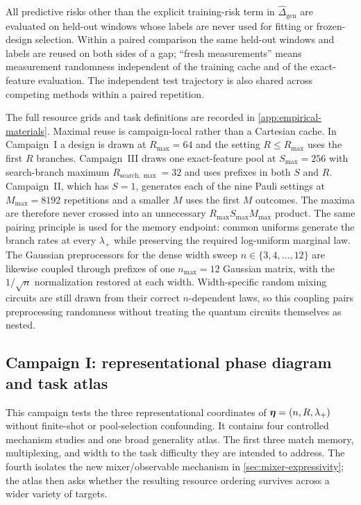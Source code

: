 All predictive risks other than the explicit training-risk term in
$\widehat\Delta_{\mathrm{gen}}$ are evaluated on held-out windows whose labels
are never used for fitting or frozen-design selection.  Within a paired
comparison the same held-out windows and labels are reused on both sides of a
gap; ``fresh measurements'' means measurement randomness independent of the
training cache and of the exact-feature evaluation.  The independent test
trajectory is also shared across competing methods within a paired repetition.

The full resource grids and task definitions are recorded in
\cref{app:empirical-materials}.  Maximal reuse is campaign-local rather than a
Cartesian cache.  In Campaign~I a design is drawn at $R_{\max}=64$ and the
setting $R\leq R_{\max}$ uses the first $R$ branches.  Campaign~III draws one
exact-feature pool at $S_{\max}=256$ with search-branch maximum
$R_{\mathrm{search},\max}=32$ and uses prefixes in both $S$ and $R$.
Campaign~II, which has $S=1$, generates each of the nine Pauli settings at
$M_{\max}=8192$ repetitions and a smaller $M$ uses the first $M$ outcomes.
The maxima are therefore never crossed into an unnecessary
$R_{\max}S_{\max}M_{\max}$ product.  The same pairing principle is used for
the memory endpoint: common uniforms generate the branch rates at every
$\lambda_+$ while preserving the required log-uniform marginal law.  The
Gaussian preprocessors for the dense width sweep $n\in\{3,4,\ldots,12\}$ are likewise
coupled through prefixes of one $n_{\max}=12$ Gaussian matrix, with the
$1/\sqrt n$ normalization restored at each width.  Width-specific random mixing circuits are still drawn from their correct $n$-dependent laws, so this coupling pairs preprocessing randomness without treating the quantum circuits themselves as nested.

\subsection{Campaign I: representational phase diagram and task atlas}
\label{sec:empirical-representation}

This campaign tests the three representational coordinates of
$\bm{\eta}=(n,R,\lambda_+)$ without finite-shot or pool-selection confounding.  It
contains four controlled mechanism studies and one broad generality atlas.
The first three match memory, multiplexing, and width to the task difficulty
they are intended to address.  The fourth isolates the new mixer/observable
mechanism in \cref{sec:mixer-expressivity}; the atlas then asks whether the
resulting resource ordering survives across a wider variety of targets.

